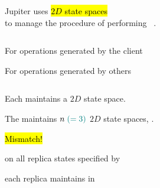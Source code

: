 \begin{frame}{}
  \begin{center}
    {\large Jupiter uses \hl{$2D$ state spaces}~ \\[5pt]
    to manage the procedure of performing ~.}
  \end{center}


  \pause
  \begin{center}
  \end{center}

  \begin{columns}
      \begin{description}
	\item[\textsc{Local} Dimension:] For operations generated by the client
	\item[\textsc{Global} Dimension:] For operations generated by others
      \end{description}
  \end{columns}
\end{frame}

\begin{frame}{}
  \centerline{\large Each  maintains a $2D$ state space.}


  \centerline{\large The  maintains $n \; \textcolor{teal}{(=3)}$ $2D$ state spaces, .}
\end{frame}

\begin{frame}{}
  \begin{center}
    \hl{\Huge Mismatch!}
    
    \vspace{1.00cm}
    {\large {} on all replica states specified by \blue{\wlspec{}}}

    \vspace{0.20cm}
    \vspace{0.20cm}

    {\large {} each replica maintains in }
  \end{center}
\end{frame}
